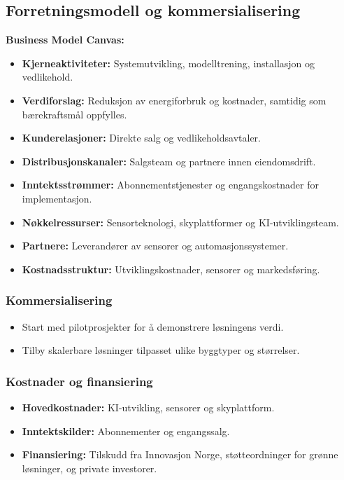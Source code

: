\subsection*{Forretningsmodell og kommersialisering}
\textbf{Business Model Canvas:} 
\begin{itemize}
    \item \textbf{Kjerneaktiviteter:} Systemutvikling, modelltrening, installasjon og vedlikehold.
    \item \textbf{Verdiforslag:} Reduksjon av energiforbruk og kostnader, samtidig som bærekraftsmål oppfylles.
    \item \textbf{Kunderelasjoner:} Direkte salg og vedlikeholdsavtaler.
    \item \textbf{Distribusjonskanaler:} Salgsteam og partnere innen eiendomsdrift.
    \item \textbf{Inntektsstrømmer:} Abonnementstjenester og engangskostnader for implementasjon.
    \item \textbf{Nøkkelressurser:} Sensorteknologi, skyplattformer og KI-utviklingsteam.
    \item \textbf{Partnere:} Leverandører av sensorer og automasjonssystemer.
    \item \textbf{Kostnadsstruktur:} Utviklingskostnader, sensorer og markedsføring.
\end{itemize}

\subsubsection*{Kommersialisering}
\begin{itemize}
    \item Start med pilotprosjekter for å demonstrere løsningens verdi.
    \item Tilby skalerbare løsninger tilpasset ulike byggtyper og størrelser.
\end{itemize}




\subsubsection*{Kostnader og finansiering}
\begin{itemize}
    \item \textbf{Hovedkostnader:} KI-utvikling, sensorer og skyplattform.
    \item \textbf{Inntektskilder:} Abonnementer og engangssalg.

    \item \textbf{Finansiering:} Tilskudd fra Innovasjon Norge, støtteordninger for grønne løsninger, og private investorer.
\end{itemize}